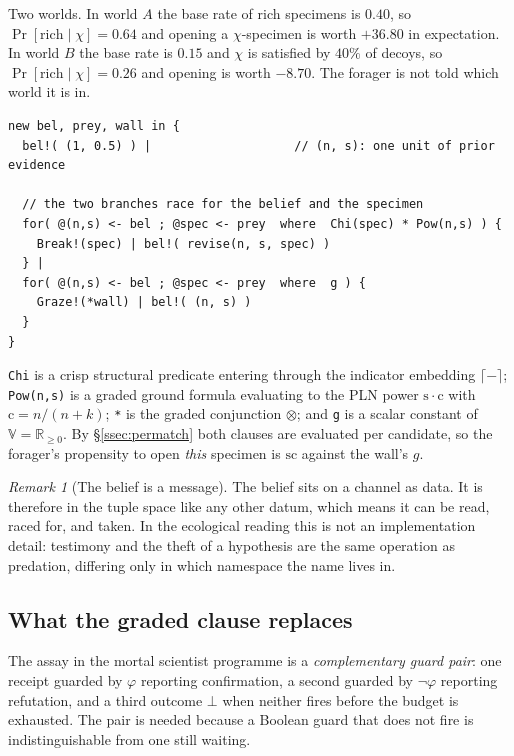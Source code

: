 \documentclass[11pt,a4paper]{article}
\theoremstyle{plain}
\theoremstyle{definition}
\theoremstyle{remark}
\newtheorem{remark}[theorem]{Remark}
\newcommand{\V}{\mathbb{V}}
\newcommand{\Rnn}{\mathbb{R}_{\geq 0}}
\newcommand{\tensorv}{\otimes}
\newcommand{\crisp}[1]{\lceil #1 \rceil}
\newcommand{\str}{\mathrm{s}}
\newcommand{\conf}{\mathrm{c}}
\begin{document}
Two worlds. In world $A$ the base rate of rich specimens is $0.40$, so
$\Pr[\text{rich} \mid \chi] = 0.64$ and opening a $\chi$-specimen is worth
$+36.80$ in expectation. In world $B$ the base rate is $0.15$ and $\chi$ is
satisfied by $40\%$ of decoys, so $\Pr[\text{rich}\mid\chi] = 0.26$ and opening
is worth $-8.70$. The forager is not told which world it is in.

\begin{lstlisting}
new bel, prey, wall in {
  bel!( (1, 0.5) ) |                    // (n, s): one unit of prior evidence

  // the two branches race for the belief and the specimen
  for( @(n,s) <- bel ; @spec <- prey  where  Chi(spec) * Pow(n,s) ) {
    Break!(spec) | bel!( revise(n, s, spec) )
  } |
  for( @(n,s) <- bel ; @spec <- prey  where  g ) {
    Graze!(*wall) | bel!( (n, s) )
  }
}
\end{lstlisting}

\noindent
\texttt{Chi} is a crisp structural predicate entering through the indicator
embedding $\crisp{-}$; \texttt{Pow(n,s)} is a graded ground formula evaluating to
the PLN power $\str \cdot \conf$ with $\conf = n/(n+k)$; \texttt{*} is the graded
conjunction $\tensorv$; and \texttt{g} is a scalar constant of $\V = \Rnn$. By
\S\ref{ssec:permatch} both clauses are evaluated per candidate, so the forager's
propensity to open \emph{this} specimen is $\str\conf$ against the wall's $g$.

\begin{remark}[The belief is a message]\label{rem:belief-message}
The belief sits on a channel as data. It is therefore in the tuple space like
any other datum, which means it can be read, raced for, and taken. In the
ecological reading this is not an implementation detail: testimony and the theft
of a hypothesis are the same operation as predation, differing only in which
namespace the name lives in.
\end{remark}

\subsection{What the graded clause replaces}

The assay in the mortal scientist programme is a \emph{complementary guard pair}:
one receipt guarded by $\varphi$ reporting confirmation, a second guarded by
$\neg\varphi$ reporting refutation, and a third outcome $\bot$ when neither fires
before the budget is exhausted. The pair is needed because a Boolean guard that
does not fire is indistinguishable from one still waiting.
\end{document}
